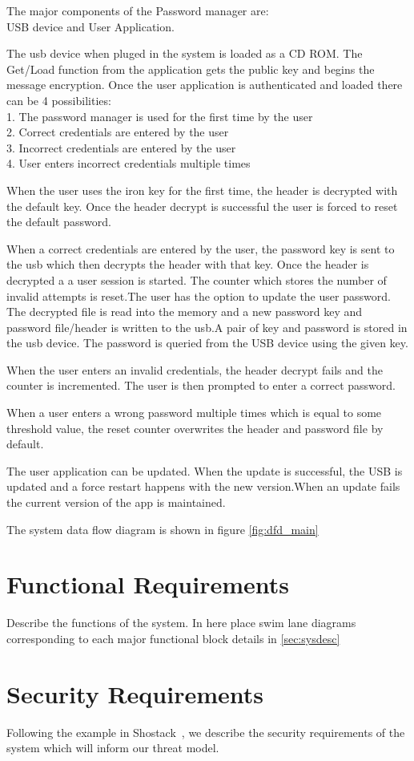 The major components of the Password manager are:\\  USB device and User Application.

The usb device when pluged in the system is loaded as a CD ROM. The Get/Load function from the application gets the public key and begins the message encryption. Once the user application is authenticated and loaded there can be 4 possibilities:
\\ 1. The password manager is used for the first time by the user
\\ 2. Correct credentials are entered by the user
\\ 3. Incorrect credentials are entered by the user
\\ 4. User enters incorrect credentials multiple times

When the user uses the iron key for the first time, the header is decrypted with the default key. Once the header decrypt is successful the user is forced to reset the default password.

When a correct credentials are entered by the user, the password key is sent to the usb which then decrypts the header with that key.
Once the header is decrypted a a user session is started. The counter which stores the number of invalid attempts is reset.The user has the option to update the user password. The decrypted file is read into the memory and a new password key and password file/header is written to the usb.A pair of key and password is stored in the usb device. The password is queried from the USB device using the given key.

When the user enters an invalid credentials, the header decrypt fails and the counter is incremented. The user is then prompted to enter a correct password. 

When a user enters a wrong password multiple times which is equal to some threshold value, the reset counter overwrites the header and password file by default.

The user application can be updated. When the update is successful, the USB is updated and a force restart happens with the new version.When an update fails the current version of the app is maintained.

The system data flow diagram is shown in figure \ref{fig:dfd_main}


\section{Functional Requirements}
\label{sec:funcreq}
Describe the functions of the system.  In here place swim lane
diagrams corresponding to each major functional block details in
\ref{sec:sysdesc}

\section{Security Requirements}
\label{sec:secreqs}
Following the example in Shostack~\cite{shostackbook}, we describe the
security requirements of the system which will inform our threat
model.
